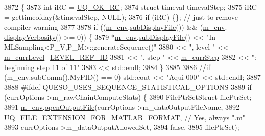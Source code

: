 \begin{DoxyCode}
3872 \{
3873   \textcolor{keywordtype}{int} iRC = \hyperlink{namespace_q_u_e_s_o_a8e909502900aecf24cedba022ea84471}{UQ\_OK\_RC};
3874   \textcolor{keyword}{struct }timeval timevalStep;
3875   iRC = gettimeofday(&timevalStep, NULL);
3876   \textcolor{keywordflow}{if} (iRC) \{\}; \textcolor{comment}{// just to remove compiler warning}
3877 
3878   \textcolor{keywordflow}{if} ((\hyperlink{class_q_u_e_s_o_1_1_m_l_sampling_a13f1ca4fe9f94822fe572a743eaced1d}{m\_env}.\hyperlink{class_q_u_e_s_o_1_1_base_environment_a8a0064746ae8dddfece4229b9ad374d6}{subDisplayFile}()) && (\hyperlink{class_q_u_e_s_o_1_1_m_l_sampling_a13f1ca4fe9f94822fe572a743eaced1d}{m\_env}.
      \hyperlink{class_q_u_e_s_o_1_1_base_environment_a1fe5f244fc0316a0ab3e37463f108b96}{displayVerbosity}() >= 0)) \{
3879     *\hyperlink{class_q_u_e_s_o_1_1_m_l_sampling_a13f1ca4fe9f94822fe572a743eaced1d}{m\_env}.\hyperlink{class_q_u_e_s_o_1_1_base_environment_a8a0064746ae8dddfece4229b9ad374d6}{subDisplayFile}() << \textcolor{stringliteral}{"In MLSampling<P\_V,P\_M>::generateSequence()"}
3880                             << \textcolor{stringliteral}{", level "} << \hyperlink{class_q_u_e_s_o_1_1_m_l_sampling_af9416874c856e50f3b35270e801f17e4}{m\_currLevel}+\hyperlink{_m_l_sampling_level_options_8h_a68d15eaf394d210effcf584b938206d3}{LEVEL\_REF\_ID}
3881                             << \textcolor{stringliteral}{", step "}  << \hyperlink{class_q_u_e_s_o_1_1_m_l_sampling_a1b1f8ccb4823bdfa26ec652f0807c63e}{m\_currStep}
3882                             << \textcolor{stringliteral}{": beginning step 11 of 11"}
3883                             << std::endl;
3884   \}
3885 
3886   \textcolor{comment}{//if (m\_env.subComm().MyPID() == 0) std::cout << "Aqui 000" << std::endl;}
3887 
3888 \textcolor{preprocessor}{#ifdef QUESO\_USES\_SEQUENCE\_STATISTICAL\_OPTIONS}
3889 \textcolor{preprocessor}{}  \textcolor{keywordflow}{if} (currOptions->m\_rawChainComputeStats) \{
3890     FilePtrSetStruct filePtrSet;
3891     \hyperlink{class_q_u_e_s_o_1_1_m_l_sampling_a13f1ca4fe9f94822fe572a743eaced1d}{m\_env}.\hyperlink{class_q_u_e_s_o_1_1_base_environment_ab8fe853074f12ea34e18724119a2fc75}{openOutputFile}(currOptions->m\_dataOutputFileName,
3892                          \hyperlink{_defines_8h_ac440026eff7deb1c1eed1eea0e8e36ba}{UQ\_FILE\_EXTENSION\_FOR\_MATLAB\_FORMAT}, \textcolor{comment}{// Yes,
       always ".m"}
3893                          currOptions->m\_dataOutputAllowedSet,
3894                          \textcolor{keyword}{false},
3895                          filePtrSet);

\end{DoxyCode}
